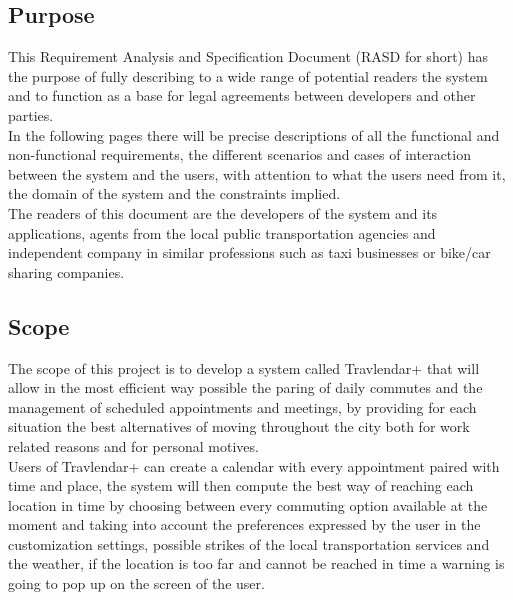 \subsection{Purpose}
This Requirement Analysis and Specification Document (RASD for short) has the purpose of fully describing to a wide range of potential readers the system and to function as a base for legal agreements between developers and other parties.
\\In the following pages there will be precise descriptions of all the functional and non-functional requirements, the different scenarios and cases of interaction between the system and the users, with attention to what the users need from it, the domain of the system and the constraints implied.
\\The readers of this document are the developers of the system and its applications, agents from the local public transportation agencies and independent company in similar professions such as taxi businesses or bike/car sharing companies.
\subsection{Scope}
The scope of this project is to develop a system called Travlendar+ that will allow in the most efficient way possible the paring of daily commutes and the management of scheduled appointments and meetings, by providing for each situation the best alternatives of moving throughout the city both for work related reasons and for personal motives. 
\\Users of Travlendar+ can create a calendar with every appointment paired with time and place, the system will then compute the best way of reaching each location in time by choosing between every commuting option available at the moment and taking into account the preferences expressed by the user in the customization settings, possible strikes of the local transportation services and the weather, if the location is too far and cannot be reached in time a warning is going to pop up on the screen of the user.
